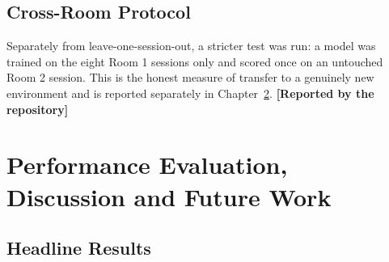 \documentclass[11pt,a4paper,oneside]{report}
\newcommand{\evidencetag}[2]{{\small\sffamily\bfseries\textcolor{#1}{[#2]}}}
\newcommand{\Repo}{\evidencetag{neutralgrey}{Reported by the repository}}
\begin{document}
\section{Cross-Room Protocol}

Separately from leave-one-session-out, a stricter test was run: a model was
trained on the eight Room 1 sessions only and scored once on an untouched
Room 2 session. This is the honest measure of transfer to a genuinely new
environment and is reported separately in Chapter~\ref{ch:results}. \Repo

\chapter{Performance Evaluation, Discussion and Future Work}
\label{ch:results}

\section{Headline Results}
\end{document}
